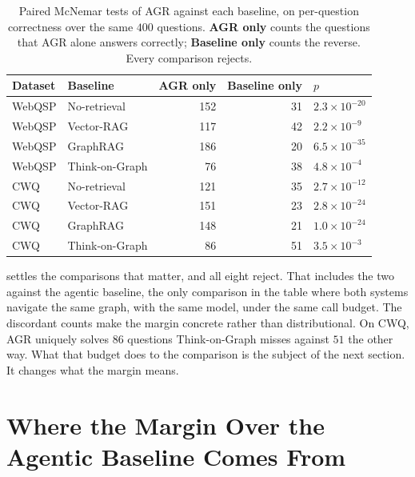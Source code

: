 \begin{table}[!tb]
  \begin{center}
    \caption[Paired McNemar tests against each baseline]{Paired McNemar tests of
    AGR against each baseline, on per-question correctness over the same $400$
    questions. \textbf{AGR only} counts the questions that AGR alone answers
    correctly; \textbf{Baseline only} counts the reverse. Every comparison
    rejects.}
    \label{tab:mcnemar}
    \small
    \begin{tabular}{|l|l|r|r|l|}
      \hline
      \textbf{Dataset} & \textbf{Baseline} & \textbf{AGR only} &
      \textbf{Baseline only} & \textbf{$p$} \\
      \hline
      WebQSP & No-retrieval   & 152 & 31 & $2.3 \times 10^{-20}$ \\
      WebQSP & Vector-RAG     & 117 & 42 & $2.2 \times 10^{-9}$ \\
      WebQSP & GraphRAG       & 186 & 20 & $6.5 \times 10^{-35}$ \\
      WebQSP & Think-on-Graph &  76 & 38 & $4.8 \times 10^{-4}$ \\
      \hline
      CWQ & No-retrieval   & 121 & 35 & $2.7 \times 10^{-12}$ \\
      CWQ & Vector-RAG     & 151 & 23 & $2.8 \times 10^{-24}$ \\
      CWQ & GraphRAG       & 148 & 21 & $1.0 \times 10^{-24}$ \\
      CWQ & Think-on-Graph &  86 & 51 & $3.5 \times 10^{-3}$ \\
      \hline
    \end{tabular}
  \end{center}
\end{table}

 settles the comparisons that matter, and all eight reject.
That includes the two against the agentic baseline, the only comparison in the
table where both systems navigate the same graph, with the same model, under the
same call budget. The discordant counts make the margin concrete rather than
distributional. On CWQ, AGR uniquely solves $86$ questions Think-on-Graph misses
against $51$ the other way. What that budget does to the comparison is the
subject of the next section. It changes what the margin means.

\section{Where the Margin Over the Agentic Baseline Comes
From}\label{sec:tog-split}

